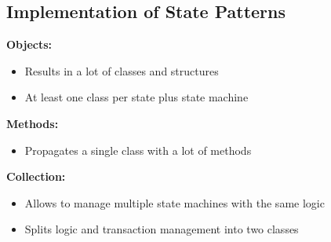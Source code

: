 \subsection{Implementation of State Patterns}
\textbf{Objects:} 
\begin{itemize}
    \item Results in a lot of classes and structures
    \item At least one class per state plus state machine
\end{itemize}
\textbf{Methods:}
\begin{itemize}
    \item Propagates a single class with a lot of methods
\end{itemize}
\textbf{Collection:}
\begin{itemize}
    \item Allows to manage multiple state machines with the same logic
    \item Splits logic and transaction management into two classes
\end{itemize}